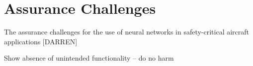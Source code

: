 \section{Assurance Challenges}

The assurance challenges for the use of neural networks in safety-critical aircraft applications [DARREN]

Show absence of unintended functionality -- do no harm
